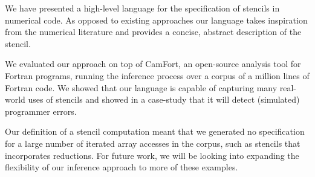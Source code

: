 \documentclass[10pt,preprint]{sigplanconf}
\theoremstyle{definition}
\begin{document}
We have presented a high-level language for the specification of
stencils in numerical code. As opposed to existing approaches our
language takes inspiration from the numerical literature and provides
a concise, abstract description of the stencil.

We evaluated our approach on top of CamFort, an open-source analysis
tool for Fortran programs, running the inference process over a corpus
of a million lines of Fortran code. We showed that our language is
capable of capturing many real-world uses of stencils and showed in a
case-study that it will detect (simulated) programmer errors.

Our definition of a stencil computation meant that we generated no
specification for a large number of iterated array accesses in the
corpus, such as stencils that incorporates reductions. For
future work, we will be looking into expanding the flexibility of 
our inference approach to more of these examples. 


\end{document}
